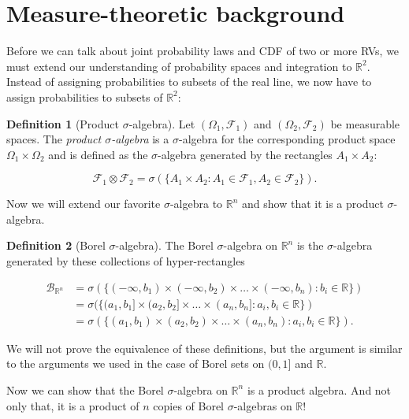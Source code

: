 \documentclass{book}
\theoremstyle{plain}%
\theoremstyle{definition}
\newtheorem{definition}{Definition}[section]
\begin{document}
\section{Measure-theoretic background}

Before we can talk about joint probability laws and CDF of two or more RVs, we must extend our understanding of probability spaces and integration to $\mathbb{R}^2$. Instead of assigning probabilities to subsets of the real line, we now have to assign probabilities to subsets of $\mathbb{R}^2$:

\begin{definition}[Product $\sigma$-algebra]
Let $(\Omega_1, \mathcal{F}_1)$ and $(\Omega_2, \mathcal{F}_2)$ be measurable spaces. The \emph{product $\sigma$-algebra} is a $\sigma$-algebra for the corresponding product space $\Omega_1 \times \Omega_2$ and is defined as the $\sigma$-algebra generated by the rectangles $A_1 \times A_2$:

$$\mathcal{F}_1 \otimes \mathcal{F}_2  = \sigma(\{A_1 \times A_2: A_1 \in \mathcal{F}_1, A_2 \in \mathcal{F}_2 \}).$$
\end{definition}

Now we will extend our favorite $\sigma$-algebra to $\mathbb{R}^n$ and show that it is a product $\sigma$-algebra.

\begin{definition}[Borel $\sigma$-algebra]
The Borel $\sigma$-algebra on $\mathbb{R}^n$ is the $\sigma$-algebra generated by these collections of hyper-rectangles

\begin{align*}
\mathcal{B}_{\mathbb{R}^n} &= \sigma(\{(-\infty, b_1) \times (-\infty, b_2) \times \hdots \times (-\infty, b_n) : b_i \in \mathbb{R}\})\\
 &= \sigma(\{(a_1, b_1] \times (a_2, b_2] \times \hdots \times (a_n, b_n] : a_i, b_i \in \mathbb{R}\})\\
&= \sigma(\{(a_1, b_1) \times (a_2, b_2) \times \hdots \times (a_n, b_n) : a_i, b_i \in \mathbb{R}\}).
\end{align*}

\end{definition}

We will not prove the equivalence of these definitions, but the argument is similar to the arguments we used in the case of Borel sets on $(0,1]$ and $\mathbb{R}$.

Now we can show that the Borel $\sigma$-algebra on $\mathbb{R}^n$ is a product algebra. And not only that, it is a product of $n$ copies of Borel $\sigma$-algebras on $\mathbb{R}$!
\end{document}
